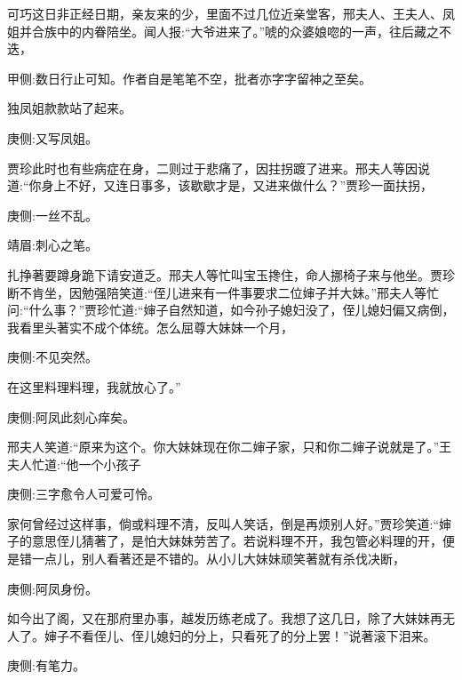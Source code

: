 \begin{parag}
    可巧这日非正经日期，亲友来的少，里面不过几位近亲堂客，邢夫人、王夫人、凤姐并合族中的内眷陪坐。闻人报:“大爷进来了。”唬的众婆娘唿的一声，往后藏之不迭，\begin{note}甲侧:数日行止可知。作者自是笔笔不空，批者亦字字留神之至矣。\end{note}独凤姐款款站了起来。\begin{note}庚侧:又写凤姐。\end{note}贾珍此时也有些病症在身，二则过于悲痛了，因拄拐踱了进来。邢夫人等因说道:“你身上不好，又连日事多，该歇歇才是，又进来做什么？”贾珍一面扶拐，\begin{note}庚侧:一丝不乱。\end{note}\begin{note}靖眉:刺心之笔。\end{note}扎挣著要蹲身跪下请安道乏。邢夫人等忙叫宝玉搀住，命人挪椅子来与他坐。贾珍断不肯坐，因勉强陪笑道:“侄儿进来有一件事要求二位婶子并大妹。”邢夫人等忙问:“什么事？”贾珍忙道:“婶子自然知道，如今孙子媳妇没了，侄儿媳妇偏又病倒，我看里头著实不成个体统。怎么屈尊大妹妹一个月，\begin{note}庚侧:不见突然。\end{note}在这里料理料理，我就放心了。”\begin{note}庚侧:阿凤此刻心痒矣。\end{note}邢夫人笑道:“原来为这个。你大妹妹现在你二婶子家，只和你二婶子说就是了。”王夫人忙道:“他一个小孩子\begin{note}庚侧:三字愈令人可爱可怜。\end{note}家何曾经过这样事，倘或料理不清，反叫人笑话，倒是再烦别人好。”贾珍笑道:“婶子的意思侄儿猜著了，是怕大妹妹劳苦了。若说料理不开，我包管必料理的开，便是错一点儿，别人看著还是不错的。从小儿大妹妹顽笑著就有杀伐决断，\begin{note}庚侧:阿凤身份。\end{note}如今出了阁，又在那府里办事，越发历练老成了。我想了这几日，除了大妹妹再无人了。婶子不看侄儿、侄儿媳妇的分上，只看死了的分上罢！”说著滚下泪来。\begin{note}庚侧:有笔力。\end{note}
\end{parag}


